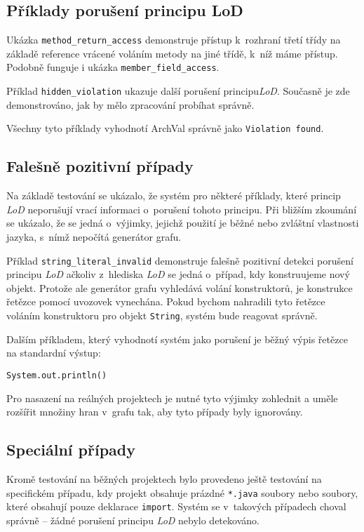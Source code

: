 \subsection{Příklady porušení principu LoD}

Ukázka \verb+method_return_access+ demonstruje přístup k~rozhraní třetí třídy na základě reference vrácené voláním metody na jiné třídě, k~níž máme přístup. Podobně funguje i ukázka \verb+member_field_access+.

Příklad \verb+hidden_violation+ ukazuje další porušení principu\emph{LoD}. Současně je zde demonstrováno, jak by mělo zpracování probíhat správně.

Všechny tyto příklady vyhodnotí ArchVal správně jako \verb+Violation found+.

\subsection{Falešně pozitivní případy}

Na základě testování se ukázalo, že systém pro některé příklady, které princip \emph{LoD} neporušují vrací informaci o~porušení tohoto principu. Při bližším zkoumání se ukázalo, že se jedná o~výjimky, jejichž použití je běžné nebo zvláštní vlastnosti jazyka, s~nímž nepočítá generátor grafu.

Příklad \verb+string_literal_invalid+ demonstruje falešně pozitivní detekci porušení principu \emph{LoD} ačkoliv z~hlediska \emph{LoD} se jedná o~případ, kdy konstruujeme nový objekt. Protože ale generátor grafu vyhledává volání konstruktorů, je konstrukce řetězce pomocí uvozovek vynechána. Pokud bychom nahradili tyto řetězce voláním konstruktoru pro objekt \verb+String+, systém bude reagovat správně.

Dalším příkladem, který vyhodnotí systém jako porušení je běžný výpis řetězce na standardní výstup:

\begin{verbatim}
System.out.println()
\end{verbatim}

Pro nasazení na reálných projektech je nutné tyto výjimky zohlednit a uměle rozšířit množiny hran v~grafu tak, aby tyto případy byly ignorovány.

\subsection{Speciální případy}

Kromě testování na běžných projektech bylo provedeno ještě testování na specifickém případu, kdy projekt obsahuje prázdné \verb+*.java+ soubory nebo soubory, které obsahují pouze deklarace \verb+import+. Systém se v~takových případech choval správně -- žádné porušení principu \emph{LoD} nebylo detekováno.
